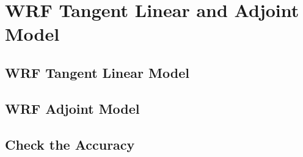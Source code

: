
\chapter{WRF Tangent Linear and Adjoint Model} %

\section{WRF Tangent Linear Model}

\section{WRF Adjoint Model}

\section{Check the Accuracy}


\ifpdf
    \graphicspath{{X/figures/PNG/}{X/figures/PDF/}{X/figures/}}
\else
    \graphicspath{{X/figures/EPS/}{X/figures/}}
\fi









